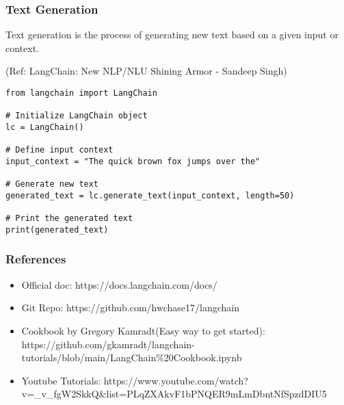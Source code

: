 \begin{frame}[fragile]\frametitle{Text Generation}

Text generation is the process of generating new text based on a given input or context. 

{\tiny (Ref: LangChain: New NLP/NLU Shining Armor - Sandeep Singh)}

\begin{lstlisting}
from langchain import LangChain

# Initialize LangChain object
lc = LangChain()

# Define input context
input_context = "The quick brown fox jumps over the"

# Generate new text
generated_text = lc.generate_text(input_context, length=50)

# Print the generated text
print(generated_text)
\end{lstlisting}	  

\end{frame}


\begin{frame}[fragile]\frametitle{References}


\begin{itemize}
\item Official doc: https://docs.langchain.com/docs/
\item Git Repo: https://github.com/hwchase17/langchain
\item Cookbook by Gregory Kamradt(Easy way to get started): https://github.com/gkamradt/langchain-tutorials/blob/main/LangChain\%20Cookbook.ipynb
\item Youtube Tutorials: https://www.youtube.com/watch?v=\_v\_fgW2SkkQ\&list=PLqZXAkvF1bPNQER9mLmDbntNfSpzdDIU5
\end{itemize}


\end{frame}